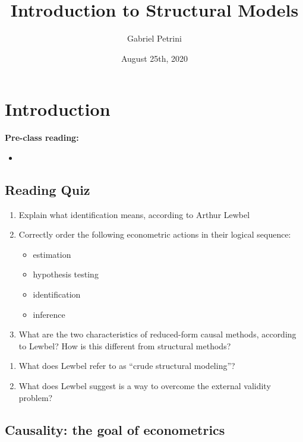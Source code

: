 \documentclass[11pt]{article}
\author{Gabriel Petrini}
\date{August 25th, 2020}
\title{Introduction to Structural Models}
\begin{document}
\maketitle
\tableofcontents



\section{Introduction}
\label{sec:org98d90c7}


\textbf{Pre-class reading:} 

\begin{itemize}
\item {}
\end{itemize}

\subsection{Reading Quiz}
\label{sec:orge1c1c5e}

\begin{enumerate}
\item Explain what identification means, according to Arthur Lewbel

\item Correctly order the following econometric actions in their logical sequence:
\begin{itemize}
\item estimation
\item hypothesis testing
\item identification
\item inference
\end{itemize}

\item What are the two characteristics of reduced-form causal methods, according to Lewbel? How is this different from structural methods?
\end{enumerate}


\begin{enumerate}
\item What does Lewbel refer to as ``crude structural modeling''?

\item What does Lewbel suggest is a way to overcome the external validity problem?
\end{enumerate}


\subsection{Causality: the goal of econometrics}
\label{sec:org27ee8d1}
\end{document}
